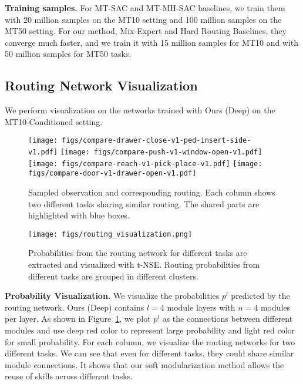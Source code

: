 \documentclass{article}
\begin{document}
\textbf{Training samples.} For MT-SAC and MT-MH-SAC baselines, we train them with 20 million samples on the MT10 setting and 100 million samples on the MT50 setting. For our method, Mix-Expert and Hard Routing Baselines, they converge much faster, and we train it with 15 million samples for MT10 and with 50 million samples for MT50 tasks. 


\vspace{-0.1in}
\subsection{Routing Network Visualization}
\vspace{-0.1in}

We perform visualization on the networks trained with Ours (Deep) on the MT10-Conditioned setting. 

\begin{figure}
\centering
\texttt{[image: figs/compare-drawer-close-v1-ped-insert-side-v1.pdf]}
\texttt{[image: figs/compare-push-v1-window-open-v1.pdf]}
\texttt{[image: figs/compare-reach-v1-pick-place-v1.pdf]}
\texttt{[image: figs/compare-door-v1-drawer-open-v1.pdf]}
\vspace{-0.05in}
    \caption{\small{Sampled observation and corresponding routing. Each column shows two different tasks sharing similar routing. 
The shared parts are highlighted with blue boxes.}
    }
	\label{figure:demo}
    \vspace{-0.2in}
 \end{figure}


\begin{wrapfigure}{li}{0.42\textwidth}
\vspace{-0.2in}
\begin{center}
\texttt{[image: figs/routing\_visualization.png]}
\vspace{-0.2in}
\caption{Probabilities from the routing network for different tasks are extracted and visualized with t-NSE. Routing probabilities from different tasks are grouped in different clusters.}
\label{figure:routing_tsne}
\vspace{-0.3in}
\end{center}
\end{wrapfigure}

\textbf{Probability Visualization.} We visualize the probabilities $p^l$ predicted by the routing network. Ours (Deep) contains $l=4$ module layers with $n=4$ modules per layer. As shown in Figure~\ref{figure:demo}, we plot $p^l$ as the connections between different modules and use deep red color to represent large probability and light red color for small probability. For each column, we visualize the routing networks for two different tasks. We can see that even for different tasks, they could share similar module connections. It shows that our soft modularization method allows the reuse of skills across different tasks. 
\end{document}
